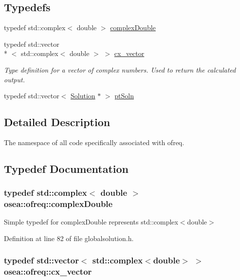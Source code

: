 \subsection*{Typedefs}
\begin{DoxyCompactItemize}
\item 
typedef std\-::complex$<$ double $>$ \hyperlink{namespaceosea_1_1ofreq_a40cad4695a41123a7ae6ab0b6e8b1664}{complex\-Double}
\item 
typedef std\-::vector\\*
$<$ std\-::complex$<$ double $>$ $>$ \hyperlink{namespaceosea_1_1ofreq_a42bf1d8bbba99693142c4184486ad3e0}{cx\-\_\-vector}
\begin{DoxyCompactList}\small\item\em Type definition for a vector of complex numbers. Used to return the calculated output. \end{DoxyCompactList}\item 
typedef std\-::vector$<$ \hyperlink{classosea_1_1ofreq_1_1_solution}{Solution} $\ast$ $>$ \hyperlink{namespaceosea_1_1ofreq_a951464fca478bccfc9e5295910e5eec3}{pt\-Soln}
\end{DoxyCompactItemize}


\subsection{Detailed Description}
The namespace of all code specifically associated with ofreq. 

\subsection{Typedef Documentation}
\hypertarget{namespaceosea_1_1ofreq_a40cad4695a41123a7ae6ab0b6e8b1664}{
\subsubsection[{complex\-Double}]{\setlength{\rightskip}{0pt plus 5cm}typedef std\-::complex$<$ double $>$ {\bf osea\-::ofreq\-::complex\-Double}}}\label{namespaceosea_1_1ofreq_a40cad4695a41123a7ae6ab0b6e8b1664}
Simple typedef for complex\-Double represents std\-::complex$<$double$>$ 

Definition at line 82 of file globalsolution.\-h.

\hypertarget{namespaceosea_1_1ofreq_a42bf1d8bbba99693142c4184486ad3e0}{
\subsubsection[{cx\-\_\-vector}]{\setlength{\rightskip}{0pt plus 5cm}typedef std\-::vector$<$ std\-::complex$<$double$>$ $>$ {\bf osea\-::ofreq\-::cx\-\_\-vector}}}\label{namespaceosea_1_1ofreq_a42bf1d8bbba99693142c4184486ad3e0}


